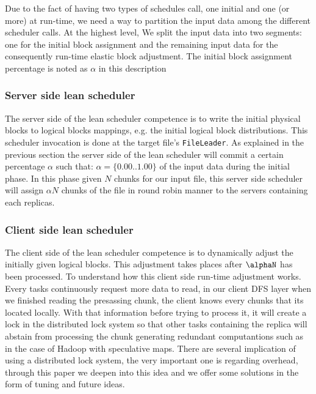 Due to the fact of having two types of schedules call, one initial and one (or more) at run-time, we need a way to partition the input data 
among the different scheduler calls. At the highest level, We split the input data into two segments: one for the initial block assignment and the remaining input data for the consequently run-time elastic block adjustment. The initial block assignment percentage is noted as $\alpha$ in this description

\subsubsection{Server side lean scheduler}
The server side of the lean scheduler competence is to write the initial physical blocks to logical blocks mappings, e.g. the initial logical block distributions. This scheduler invocation is done at the target file's \texttt{FileLeader}. As explained in the previous section the server side of the lean scheduler will commit a certain percentage $\alpha$ such that: $\alpha = \{0.00..1.00\}$ of the input data during the initial phase. In this phase given $N$ chunks for our input file, this server side scheduler will assign $\alpha N$ chunks of the file in round robin manner to the servers containing each replicas. 

\subsubsection{Client side lean scheduler}
The client side of the lean scheduler competence is to dynamically adjust the initially given logical blocks. This adjustment takes places after $\alphaN$ has been processed. To understand how this client side run-time adjustment works. Every tasks continuously request more data to read, in our client DFS layer when we finished reading the presassing chunk, the client knows every chunks that its located locally. With that information before trying to process it, it will create a lock in the distributed lock system so that other tasks containing the replica will abstain from processing the chunk generating redundant computantions such as in the case of Hadoop with speculative maps. There are several implication of using a distributed lock system, the very important one is regarding overhead, through this paper we 
deepen into this idea and we offer some solutions in the form of tuning and future ideas.



